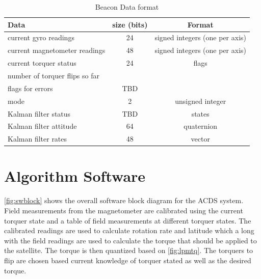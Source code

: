 \begin{table}[H]
    \begin{tabular}{|l|c|c|}
        \hline
        Data&size (bits)&Format\\
        \hline
        current gyro readings&24&signed integers (one per axis)\\
        \hline
        current magnetometer readings&48&signed integers (one per axis)\\
        \hline
        current torquer status&24&flags\\
        \hline
        number of torquer flips so far &&\\
        \hline
        flags for errors&TBD&\\
        \hline
        mode&2&unsigned integer\\
        \hline
        Kalman filter status&TBD&states\\
        \hline
        Kalman filter attitude&64&quaternion\\
        \hline
        Kalman filter rates&48&vector\\
        \hline
    \end{tabular}
    \caption{Beacon Data format}
    \label{tab:beacondat}
\end{table}

\section{Algorithm Software}

\autoref{fig:swblock} shows the overall software block diagram for the \ac{ACDS} system. Field measurements from the magnetometer are calibrated using the current torquer state and a table of field measurements at different torquer states. The calibrated readings are used to calculate rotation rate and latitude which a long with the field readings are used to calculate the torque that should be applied to the satellite. The torque is then quantized based on \autoref{fig:lpmtq}. The torquers to flip are chosen based current knowledge of torquer stated as well as the desired torque.

